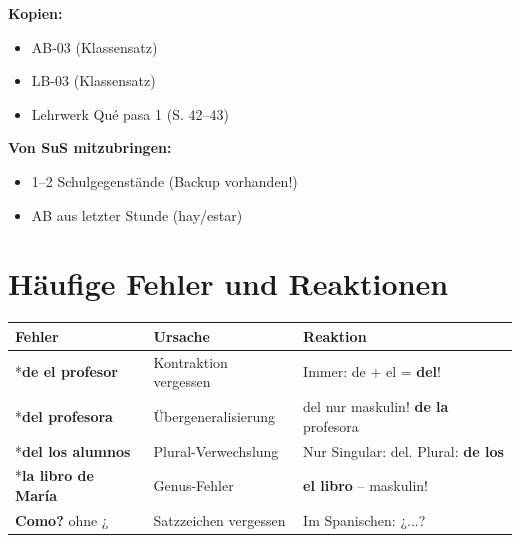 \documentclass[11pt,a4paper]{article}
\newcommand{\es}[1]{\textbf{#1}}
\begin{document}
\vspace{0.3cm}

\textbf{Kopien:}
\begin{itemize}[nosep]
    \item[$\square$] AB-03 (Klassensatz)
    \item[$\square$] LB-03 (Klassensatz)
    \item[$\square$] Lehrwerk Qué pasa 1 (S. 42--43)
\end{itemize}

\vspace{0.3cm}

\textbf{Von SuS mitzubringen:}
\begin{itemize}[nosep]
    \item 1--2 Schulgegenstände (Backup vorhanden!)
    \item AB aus letzter Stunde (hay/estar)
\end{itemize}

\vspace{0.5cm}

\section*{Häufige Fehler und Reaktionen}

\begin{tabular}{|p{3.5cm}|p{3.5cm}|p{6cm}|}
\hline
\textbf{Fehler} & \textbf{Ursache} & \textbf{Reaktion} \\
\hline
*\es{de el profesor} & Kontraktion vergessen & Immer: de + el = \textbf{del}! \\
\hline
*\es{del profesora} & Übergeneralisierung & del nur maskulin! \es{de la} profesora \\
\hline
*\es{del los alumnos} & Plural-Verwechslung & Nur Singular: del. Plural: \es{de los} \\
\hline
*\es{la libro de María} & Genus-Fehler & \es{el libro} -- maskulin! \\
\hline
\es{Como?} ohne ¿ & Satzzeichen vergessen & Im Spanischen: ¿...? \\
\hline
\end{tabular}

\vspace{0.5cm}

\end{document}
